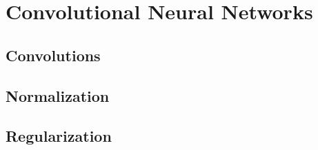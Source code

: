 \section{Convolutional Neural Networks}
\subsection{Convolutions}


\subsection{Normalization}

\subsection{Regularization}

